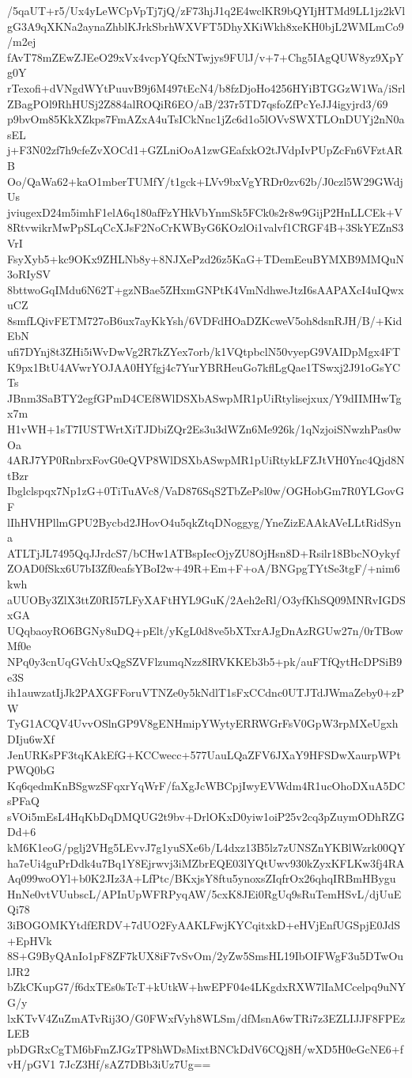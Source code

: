 /5qaUT+r5/Ux4yLeWCpVpTj7jQ/zF73hjJ1q2E4wclKR9bQYIjHTMd9LL1jz2kVl
gG3A9qXKNa2aynaZhblKJrkSbrhWXVFT5DhyXKiWkh8xeKH0bjL2WMLmCo9/m2ej
fAvT78mZEwZJEeO29xVx4vcpYQfxNTwjys9FUlJ/v+7+Chg5IAgQUW8yz9XpYg0Y
rTexofi+dVNgdWYtPuuvB9j6M497tEcN4/b8fzDjoHo4256HYiBTGGzW1Wa/iSrl
ZBagPOl9RhHUSj2Z884alROQiR6EO/aB/237r5TD7qsfoZfPcYeJJ4igyjrd3/69
p9bvOm85KkXZkps7FmAZxA4uTsICkNnc1jZc6d1o5lOVvSWXTLOnDUYj2nN0asEL
j+F3N02zf7h9cfeZvXOCd1+GZLniOoA1zwGEafxkO2tJVdpIvPUpZcFn6VFztARB
Oo/QaWa62+kaO1mberTUMfY/t1gck+LVv9bxVgYRDr0zv62b/J0czl5W29GWdjUs
jviugexD24m5imhF1elA6q180afFzYHkVbYnmSk5FCk0s2r8w9GijP2HnLLCEk+V
8RtvwikrMwPpSLqCcXJsF2NoCrKWByG6KOzlOi1valvf1CRGF4B+3SkYEZnS3VrI
FsyXyb5+kc9OKx9ZHLNb8y+8NJXePzd26z5KaG+TDemEeuBYMXB9MMQuN3oRIySV
8bttwoGqIMdu6N62T+gzNBae5ZHxmGNPtK4VmNdhweJtzI6sAAPAXcI4uIQwxuCZ
8smfLQivFETM727oB6ux7ayKkYsh/6VDFdHOaDZKcweV5oh8dsnRJH/B/+KidEbN
ufi7DYnj8t3ZHi5iWvDwVg2R7kZYex7orb/k1VQtpbclN50vyepG9VAIDpMgx4FT
K9px1BtU4AVwrYOJAA0HYfgj4c7YurYBRHeuGo7kflLgQae1TSwxj2J91oGsYCTs
JBnm3SaBTY2egfGPmD4CEf8WlDSXbASwpMR1pUiRtylisejxux/Y9dIIMHwTgx7m
H1vWH+1sT7IUSTWrtXiTJDbiZQr2Es3u3dWZn6Me926k/1qNzjoiSNwzhPas0wOa
4ARJ7YP0RnbrxFovG0eQVP8WlDSXbASwpMR1pUiRtykLFZJtVH0Ync4Qjd8NtBzr
Ibglclspqx7Np1zG+0TiTuAVc8/VaD876SqS2TbZePsl0w/OGHobGm7R0YLGovGF
lIhHVHPllmGPU2Bycbd2JHovO4u5qkZtqDNoggyg/YneZizEAAkAVeLLtRidSyna
ATLTjJL7495QqJJrdcS7/bCHw1ATBspIecOjyZU8OjHsn8D+Rsilr18BbcNOykyf
ZOAD0fSkx6U7bI3Zf0eafsYBoI2w+49R+Em+F+oA/BNGpgTYtSe3tgF/+nim6kwh
aUUOBy3ZlX3ttZ0RI57LFyXAFtHYL9GuK/2Aeh2eRl/O3yfKhSQ09MNRvIGDSxGA
UQqbaoyRO6BGNy8uDQ+pElt/yKgL0d8ve5bXTxrAJgDnAzRGUw27n/0rTBowMf0e
NPq0y3cnUqGVchUxQgSZVFlzumqNzz8IRVKKEb3b5+pk/auFTfQytHcDPSiB9e3S
ih1auwzatIjJk2PAXGFForuVTNZe0y5kNdlT1sFxCCdnc0UTJTdJWmaZeby0+zPW
TyG1ACQV4UvvOSlnGP9V8gENHmipYWytyERRWGrFsV0GpW3rpMXeUgxhDIju6wXf
JenURKsPF3tqKAkEfG+KCCwecc+577UauLQaZFV6JXaY9HFSDwXaurpWPtPWQ0bG
Kq6qedmKnBSgwzSFqxrYqWrF/faXgJcWBCpjIwyEVWdm4R1ucOhoDXuA5DCsPFaQ
sVOi5mEsL4HqKbDqDMQUG2t9bv+DrlOKxD0yiw1oiP25v2cq3pZuymODhRZGDd+6
kM6K1eoG/pglj2VHg5LEvvJ7g1yuSXe6b/L4dxz13B5lz7zUNSZnYKBlWzrk00QY
ha7eUi4guPrDdk4u7Bq1Y8Ejrwvj3iMZbrEQE03lYQtUwv930kZyxKFLKw3fj4RA
Aq099woOYl+b0K2JIz3A+LfPtc/BKxjsY8ftu5ynoxsZIqfrOx26qhqIRBmHBygu
HnNe0vtVUubscL/APInUpWFRPyqAW/5cxK8JEi0RgUq9sRuTemHSvL/djUuEQi78
3iBOGOMKYtdfERDV+7dUO2FyAAKLFwjKYCqitxkD+eHVjEnfUGSpjE0JdS+EpHVk
8S+G9ByQAnIo1pF8ZF7kUX8iF7vSvOm/2yZw5SmsHL19IbOIFWgF3u5DTwOulJR2
bZkCKupG7/f6dxTEs0sTcT+kUtkW+hwEPF04e4LKgdxRXW7lIaMCcelpq9uNYG/y
lxKTvV4ZuZmATvRij3O/G0FWxfVyh8WLSm/dfMsnA6wTRi7z3EZLIJJF8FPEzLEB
pbDGRxCgTM6bFmZJGzTP8hWDsMixtBNCkDdV6CQj8H/wXD5H0eGcNE6+fvH/pGV1
7JcZ3Hf/sAZ7DBb3iUz7Ug==
